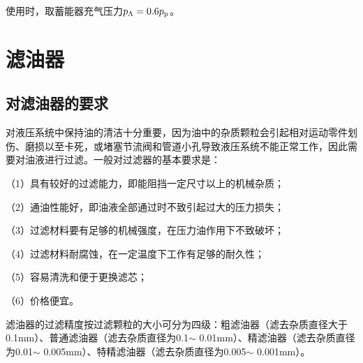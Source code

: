 使用时，取蓄能器充气压力$p_{\Lambda}=0.6p_{\mbox{\scriptsize p}}$。

\section{滤油器}

\subsection{对滤油器的要求}

对液压系统中保持油的清洁十分重要，因为油中的杂质颗粒会引起相对运动零件划伤、磨损以至卡死，或堵塞节流阀和管道小孔导致液压系统不能正常工作，因此需要对油液进行过滤。一般对过滤器的基本要求是：

（1）具有较好的过滤能力，即能阻挡一定尺寸以上的机械杂质；

（2）通油性能好，即油液全部通过时不致引起过大的压力损失；

（3）过滤材料要有足够的机械强度，在压力油作用下不致破坏；

（4）过滤材料耐腐蚀，在一定温度下工作有足够的耐久性；

（5）容易清洗和便于更换滤芯；

（6）价格便宜。

滤油器的过滤精度按过滤颗粒的大小可分为四级：粗滤油器（滤去杂质直径大于0.1mm）、普通滤油器（滤去杂质直径为0.1$\sim$ 0.01mm）、精滤油器（滤去杂质直径为0.01$\sim$ 0.005mm）、特精滤油器（滤去杂质直径为0.005$\sim$ 0.001mm）。
